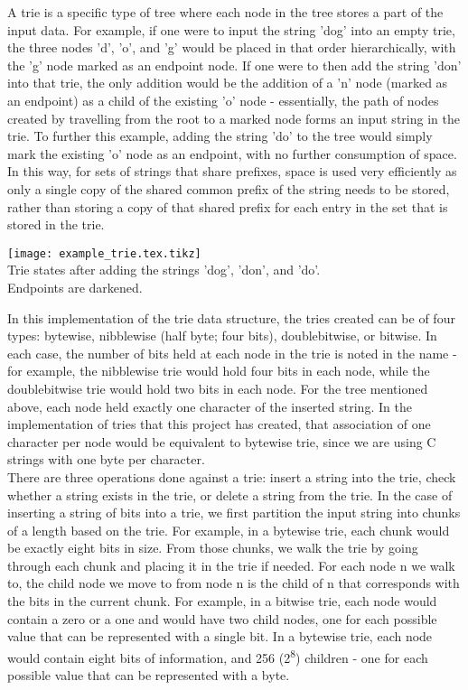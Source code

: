 \documentclass{llncs}
\begin{document}
A trie is a specific type of tree where each node in the tree stores a part of the input data. For example, if one were to input the string 'dog' into an empty trie, the three nodes 'd', 'o', and 'g' would be placed in that order hierarchically, with the 'g' node marked as an endpoint node. If one were to then add the string 'don' into that trie, the only addition would be the addition of a 'n' node (marked as an endpoint) as a child of the existing 'o' node - essentially, the path of nodes created by travelling from the root to a marked node forms an input string in the trie. To further this example, adding the string 'do' to the tree would simply mark the existing 'o' node as an endpoint, with no further consumption of space. In this way, for sets of strings that share prefixes, space is used very efficiently as only a single copy of the shared common prefix of the string needs to be stored, rather than storing a copy of that shared prefix for each entry in the set that is stored in the trie. \\ 
\begin{center}
\texttt{[image: example\_trie.tex.tikz]}
\\
Trie states after adding the strings 'dog', 'don', and 'do'.\\
Endpoints are darkened.\\
\end{center}
In this implementation of the trie data structure, the tries created can be of four types: bytewise, nibblewise (half byte; four bits), doublebitwise, or bitwise. In each case, the number of bits held at each node in the trie is noted in the name - for example, the nibblewise trie would hold four bits in each node, while the doublebitwise trie would hold two bits in each node. For the tree mentioned above, each node held exactly one character of the inserted string. In the implementation of tries that this project has created, that association of one character per node would be equivalent to bytewise trie, since we are using C strings with one byte per character. \\
There are three operations done against a trie: insert a string into the trie, check whether a string exists in the trie, or delete a string from the trie. In the case of inserting a string of bits into a trie, we first partition the input string into chunks of a length based on the trie. For example, in a bytewise trie, each chunk would be exactly eight bits in size. From those chunks, we walk the trie by going through each chunk and placing it in the trie if needed. For each node n we walk to, the child node we move to from node n is the child of n that corresponds with the bits in the current chunk. For example, in a bitwise trie, each node would contain a zero or a one and would have two child nodes, one for each possible value that can be represented with a single bit. In a bytewise trie, each node would contain eight bits of information, and 256 (2\textsuperscript{8}) children - one for each possible value that can be represented with a byte. \\
\end{document}
